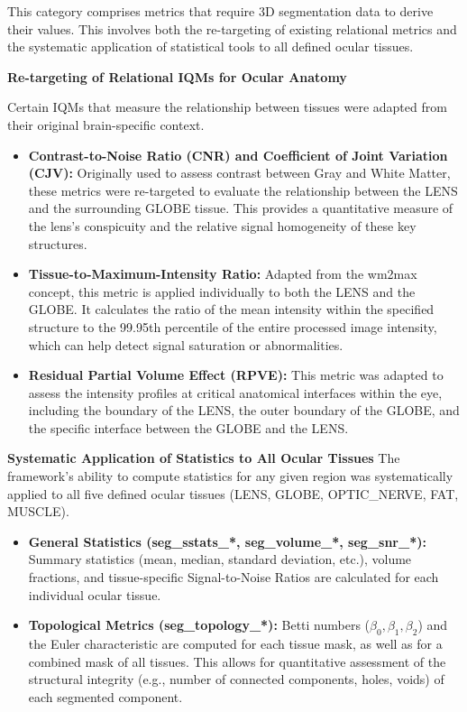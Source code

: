This category comprises metrics that require 3D segmentation data to derive their values. This involves both the re-targeting of existing relational metrics and the systematic application of statistical tools to all defined ocular tissues.

\textbf{Re-targeting of Relational IQMs for Ocular Anatomy}

Certain IQMs that measure the relationship between tissues were adapted from their original brain-specific context.

\begin{itemize}
    \item \textbf{Contrast-to-Noise Ratio (CNR) and Coefficient of Joint Variation (CJV):} Originally used to assess contrast between Gray and White Matter, these metrics were re-targeted to evaluate the relationship between the LENS and the surrounding GLOBE tissue. This provides a quantitative measure of the lens's conspicuity and the relative signal homogeneity of these key structures.
    \item \textbf{Tissue-to-Maximum-Intensity Ratio:}  Adapted from the wm2max concept, this metric is applied individually to both the LENS and the GLOBE. It calculates the ratio of the mean intensity within the specified structure to the 99.95th percentile of the entire processed image intensity, which can help detect signal saturation or abnormalities.
    \item \textbf{Residual Partial Volume Effect (RPVE):} This metric was adapted to assess the intensity profiles at critical anatomical interfaces within the eye, including the boundary of the LENS, the outer boundary of the GLOBE, and the specific interface between the GLOBE and the LENS.
\end{itemize}

\textbf{Systematic Application of Statistics to All Ocular Tissues}
The framework's ability to compute statistics for any given region was systematically applied to all five defined ocular tissues (LENS, GLOBE, OPTIC\_NERVE, FAT, MUSCLE).

\begin{itemize}
    \item \textbf{General Statistics (seg\_sstats\_*, seg\_volume\_*, seg\_snr\_*):}  Summary statistics (mean, median, standard deviation, etc.), volume fractions, and tissue-specific Signal-to-Noise Ratios are calculated for each individual ocular tissue.
    \item \textbf{Topological Metrics (seg\_topology\_*):} Betti numbers ($\beta_0, \beta_1, \beta_2$) and the Euler characteristic are computed for each tissue mask, as well as for a combined mask of all tissues. This allows for quantitative assessment of the structural integrity (e.g., number of connected components, holes, voids) of each segmented component. 
\end{itemize}

